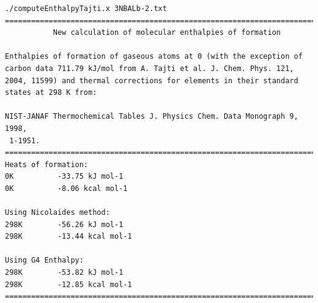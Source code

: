 \begin{lstlisting}[caption = Output de 3NBALb-2.txt en EnthalpyTajti]
./computeEnthalpyTajti.x 3NBALb-2.txt
========================================================================
           New calculation of molecular enthalpies of formation                         
                                                                                                   
Enthalpies of formation of gaseous atoms at 0 (with the exception of 
carbon data 711.79 kJ/mol from A. Tajti et al. J. Chem. Phys. 121, 
2004, 11599) and thermal corrections for elements in their standard 
states at 298 K from:                   
                                                                                                   
NIST-JANAF Thermochemical Tables J. Physics Chem. Data Monograph 9, 1998,
 1-1951.
========================================================================
Heats of formation: 
0K          -33.75 kJ mol-1
0K          -8.06 kcal mol-1
                                                                                                   
Using Nicolaides method: 
298K        -56.26 kJ mol-1
298K        -13.44 kcal mol-1
                                                                                                   
Using G4 Enthalpy: 
298K        -53.82 kJ mol-1
298K        -12.85 kcal mol-1
========================================================================
\end{lstlisting}

\newpage


